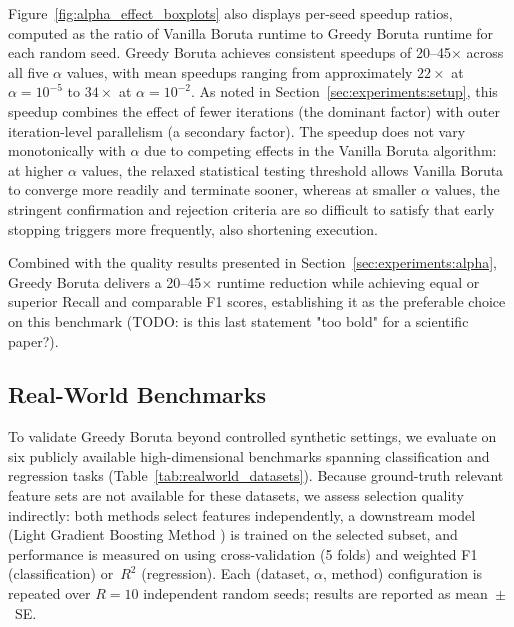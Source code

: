 \documentclass[runningheads]{llncs}
\begin{document}
Figure~\ref{fig:alpha_effect_boxplots} also displays per-seed speedup ratios, computed as the ratio of Vanilla
Boruta runtime to Greedy Boruta runtime for each random seed.
Greedy Boruta achieves consistent speedups of 20--45$\times$ across all five $\alpha$ values,
with mean speedups ranging from approximately $22\times$ at $\alpha=10^{-5}$ to $34\times$ at
$\alpha=10^{-2}$.
As noted in Section~\ref{sec:experiments:setup}, this speedup combines the effect of fewer
iterations (the dominant factor) with outer iteration-level parallelism (a secondary factor).
The speedup does not vary monotonically with $\alpha$ due to competing effects in the Vanilla
Boruta algorithm: at higher $\alpha$ values, the relaxed statistical testing threshold allows
Vanilla Boruta to converge more readily and terminate sooner, whereas at smaller $\alpha$ values,
the stringent confirmation and rejection criteria are so difficult to satisfy that early stopping
triggers more frequently, also shortening execution.
 
Combined with the quality results presented in Section~\ref{sec:experiments:alpha}, Greedy Boruta
delivers a 20--45$\times$ runtime reduction while achieving equal or superior Recall and
comparable F1 scores, establishing it as the preferable choice on this benchmark (TODO: is this last statement "too bold" for a scientific paper?).

 
\subsection{Real-World Benchmarks}
\label{sec:experiments:realworld}
 
To validate Greedy Boruta beyond controlled synthetic settings, we evaluate on six
publicly available high-dimensional benchmarks spanning classification and regression
tasks (Table~\ref{tab:realworld_datasets}).
Because ground-truth relevant feature sets are not available for these datasets,
we assess selection quality indirectly: both methods select features independently,
a downstream model (Light Gradient Boosting Method \cite{ke2017lightgbm}) is trained on the selected subset, and performance is measured on using cross-validation (5 folds) and weighted F1 (classification) or~$R^2$ (regression).
Each (dataset, $\alpha$, method) configuration is repeated over $R = 10$ independent
random seeds; results are reported as mean~$\pm$~SE.
 
\end{document}
